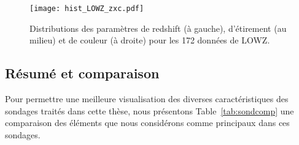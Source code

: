 \documentclass[../main/main.tex]{subfiles}
\begin{document}
\begin{figure}[ht]
    \centering
    \texttt{[image: hist\_LOWZ\_zxc.pdf]}
    \captionsetup{justification=centering}
    \caption{Distributions des paramètres de redshift (à gauche), d'étirement (au
    milieu) et de couleur (à droite) pour les 172 données de LOWZ.}
    \label{fig:lowzhist}
\end{figure}

\subsection{Résumé et comparaison}\label{ssec:sondcomp}

Pour permettre une meilleure visualisation des diverses caractéristiques des
sondages traités dans cette thèse, nous présentons Table~\ref{tab:sondcomp} une
comparaison des éléments que nous considérons comme principaux dans ces
sondages.
\end{document}
